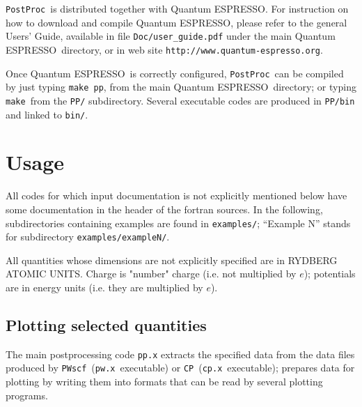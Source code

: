 \documentclass[12pt,a4paper]{article}
\def\qe{{\sc Quantum ESPRESSO}}
\def\pwx{\texttt{pw.x}}
\def\cpx{\texttt{cp.x}}
\def\PWscf{\texttt{PWscf}}
\def\CP{\texttt{CP}}
\def\PostProc{\texttt{PostProc}}
\def\make{\texttt{make}}
\begin{document}
\PostProc\ is distributed together with \qe.
For instruction on how to download and compile \qe, please refer 
to the general Users' Guide, available in file \texttt{Doc/user\_guide.pdf}
under the main \qe\ directory, or in web site 
\texttt{http://www.quantum-espresso.org}.

Once \qe\ is correctly configured, \PostProc\ can be compiled by
just typing \texttt{make pp}, from the main \qe\ directory;
or typing \make\ from the \texttt{PP/} subdirectory.
Several executable codes are produced in \texttt{PP/bin}
and linked to \texttt{bin/}.

\section{Usage}

All codes for which input documentation is not explicitly mentioned below
have some documentation in the header of the fortran sources.
In the following, subdirectories containing examples are found in
\texttt{examples/}; ``Example N'' stands for subdirectory 
\texttt{examples/exampleN/}.

All quantities whose dimensions are not explicitly specified are in
RYDBERG ATOMIC UNITS. Charge is "number" charge (i.e. not multiplied 
by $e$); potentials are in energy units (i.e. they are multiplied by 
$e$).

\subsection{Plotting selected quantities}
  
The main postprocessing code \texttt{pp.x} extracts the specified data
from the data files produced by \PWscf\ (\pwx\ executable) or \CP\ 
(\cpx\ executable); prepares data for plotting by writing them into 
formats that can be read by several plotting programs.
\end{document}
